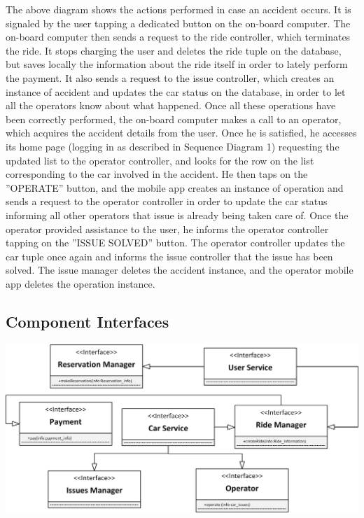 \documentclass{article}
\begin{document}
\begin{flushleft}
The above diagram shows the actions performed in case an accident occurs. It is signaled by the user tapping a dedicated button on the on-board computer. The on-board computer then sends a request to the ride controller, which terminates the ride. It stops charging the user and deletes the ride tuple on the database, but saves locally the information about the ride itself in order to lately perform the payment. It also sends a request to the issue controller, which creates an instance of accident and updates the car status on the database, in order to let all the operators know about what happened. Once all these operations have been correctly performed, the on-board computer makes a call to an operator, which acquires the accident details from the user. Once he is satisfied, he accesses its home page (logging in as described in Sequence Diagram 1) requesting the updated list to the operator controller, and looks for the row on the list corresponding to the car involved in the accident. He then taps on the ''OPERATE'' button, and the mobile app creates an instance of operation and sends a request to the operator controller in order to update the car status informing all other operators that issue is already being taken care of. Once the operator provided assistance to the user, he informs the operator controller tapping on the ''ISSUE SOLVED'' button. The operator controller updates the car tuple once again and informs the issue controller that the issue has been solved. The issue manager deletes the accident instance, and the operator mobile app deletes the operation instance.


\newpage

\subsection{Component Interfaces} %
\includegraphics[scale=0.7]{interface} 


\end{flushleft}
\end{document}
